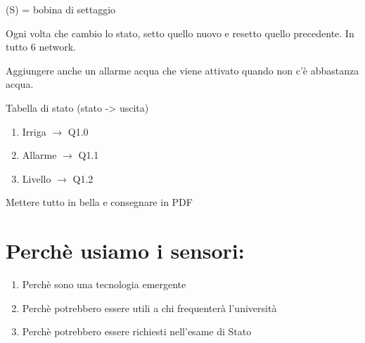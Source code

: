 \documentclass{article}
\begin{document}
    (S) = bobina di settaggio

    Ogni volta che cambio lo stato, setto quello nuovo e resetto quello precedente.
    In tutto 6 network.

    Aggiungere anche un allarme acqua che viene attivato quando non c'è abbastanza acqua.

    Tabella di stato (stato -> uscita)
    \begin{enumerate}
        \item Irriga $\rightarrow$ Q1.0
        \item Allarme $\rightarrow$ Q1.1
        \item Livello $\rightarrow$ Q1.2
    \end{enumerate}

    Mettere tutto in bella e consegnare in PDF

    \section{Perchè usiamo i sensori:}

    \begin{enumerate}
        \item Perchè sono una tecnologia emergente
        \item Perchè potrebbero essere utili a chi frequenterà l'università
        \item Perchè potrebbero essere richiesti nell'esame di Stato
    \end{enumerate}
\end{document}
